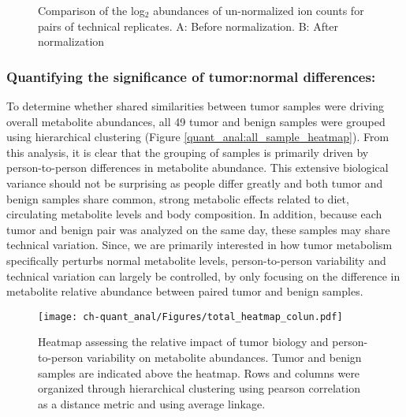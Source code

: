 \begin{figure}[h!]
\begin{center}
\hspace{1mm}

\caption[Comparison of the log$_{2}$ abundances of un-normalized ion counts for pairs of technical replicates]{Comparison of the log$_{2}$ abundances of un-normalized ion counts for pairs of technical replicates.  A: Before normalization. B: After normalization}
\label{ch-quant_anal:replicate_corr}
\end{center}
\end{figure}

\subsubsection{Quantifying the significance of tumor:normal differences:}

To determine whether shared similarities between tumor samples were driving overall metabolite abundances, all 49 tumor and benign samples were grouped using hierarchical clustering (Figure \ref{quant_anal:all_sample_heatmap}). From this analysis, it is clear that the grouping of samples is primarily driven by person-to-person differences in metabolite abundance.  This extensive biological variance should not be surprising as people differ greatly and both tumor and benign samples share common, strong   metabolic effects related to diet, circulating metabolite levels and body composition.  In addition, because each tumor and benign pair was analyzed on the same day, these samples may share technical variation.  Since, we are primarily interested in how tumor metabolism specifically perturbs normal metabolite levels, person-to-person variability and technical variation can largely be controlled, by only focusing on the difference in metabolite relative abundance between paired tumor and benign samples. 

\begin{figure}[h!]
\begin{center}
\texttt{[image: ch-quant\_anal/Figures/total\_heatmap\_colun.pdf]}
\caption[Heatmap assessing the relative impact of tumor biology and person-to-person variability on metabolite abundances.]{Heatmap assessing the relative impact of tumor biology and person-to-person variability on metabolite abundances.  Tumor and benign samples are indicated above the heatmap.  Rows and columns were organized through hierarchical clustering using pearson correlation as a distance metric and using average linkage.}
\label{ch-quant_anal:all_sample_heatmap}
\end{center}
\end{figure}

